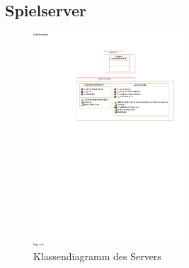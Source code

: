 \subsection{Spielserver}
\label{sec:Spielserver}

\begin{figure}[H]
  \centering
  \includegraphics[trim=60mm 165mm 10mm 20mm,clip,width=0.5\textwidth]{images/Server.pdf}
  \caption{Klassendiagramm des Servers}
  \label{fig:Serverklassendiagramm}
\end{figure}

